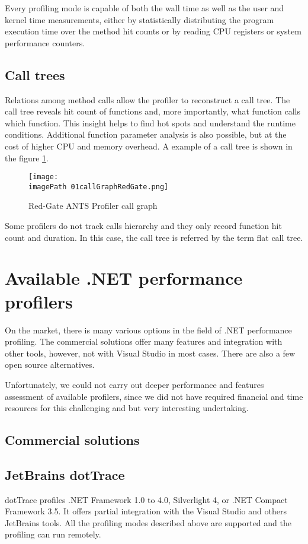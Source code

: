 Every profiling mode is capable of both the wall time as well as the user and kernel time measurements, either by statistically distributing the program execution time over the method hit counts or by reading CPU registers or system performance counters.

\subsection{Call trees}
Relations among method calls allow the profiler to reconstruct a call tree. The call tree reveals hit count of functions and, more importantly, what function calls which function. This insight helps to find hot spots and understand the runtime conditions.
Additional function parameter analysis is also possible, but at the cost of higher CPU and memory overhead. A example of a call tree is shown in the figure \ref{fig:01callGraphRedGate}.

\begin{figure}
	\centering
		\texttt{[image: \\imagePath 01callGraphRedGate.png]}
		\caption{Red-Gate ANTS Profiler call graph}
	\label{fig:01callGraphRedGate}
\end{figure}

Some profilers do not track calls hierarchy and they only record function hit count and duration. In this case, the call tree is referred by the term flat call tree.

\section{Available .NET performance profilers}
On the market, there is many various options in the field of .NET performance profiling. The commercial solutions offer many features and integration with other tools, however, not with Visual Studio in most cases. There are also a few open source alternatives.

Unfortunately, we could not carry out deeper performance and features assessment of available profilers, since we did not have required financial and time resources for this challenging and but very interesting undertaking.

\subsection*{Commercial solutions}

\subsection{JetBrains dotTrace}
dotTrace profiles .NET Framework 1.0 to 4.0, Silverlight 4, or .NET Compact Framework 3.5. It offers partial integration with the Visual Studio and others JetBrains tools. All the profiling modes described above are supported and the profiling can run remotely.

